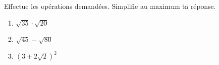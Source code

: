 %
%
    Effectue les opérations demandées. Simplifie au maximum ta réponse.
    \begin{enumerate}[cols=3]
        \item $\sqrt{35}\cdot\sqrt{20}$
        \item $\sqrt{45}-\sqrt{80}$
        \item $\left(3 + 2\sqrt{2}\right)^2$
    \end{enumerate}
